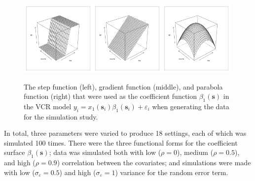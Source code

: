 \documentclass[authoryear,review, 12pt]{elsarticle}
\begin{document}
\begin{figure}
\includegraphics[width=0.33\textwidth]{0_Users_wesley_git_gwr_figures_simulation_step.pdf}\includegraphics[width=0.33\textwidth]{1_Users_wesley_git_gwr_figures_simulation_gradient.pdf}\includegraphics[width=0.33\textwidth]{2_Users_wesley_git_gwr_figures_simulation_parabola.pdf}

\protect\caption{The step function (left), gradient function (middle), and parabola
function (right) that were used as the coefficient function $\beta_{1}(\bm{s})$
in the VCR model $y_{i}=x_{1}(\bm{s}_{i})\beta_{1}(\bm{s}_{i})+\varepsilon_{i}$
when generating the data for the simulation study.\label{fig:simulation-coefficient-functions}}
\end{figure}


In total, three parameters were varied to produce 18 settings, each
of which was simulated 100 times. There were the three functional
forms for the coefficient surface $\beta_{1}(\bm{s})$; data was simulated
both with low ($\rho=0$), medium ($\rho=0.5$), and high ($\rho=0.9$)
correlation between the covariates; and simulations were made with
low ($\sigma_{\varepsilon}=0.5$) and high ($\sigma_{\varepsilon}=1$)
variance for the random error term.
\end{document}
